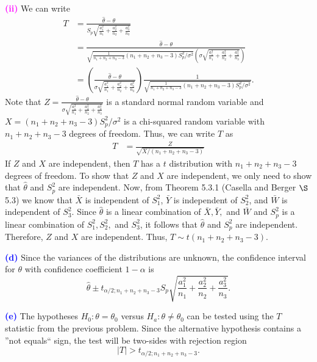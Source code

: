 \documentclass[12pt]{article}
\begin{document}
\noindent\textcolor{magenta}{\textbf{(ii)}} We can write
\begin{align}
T &= \frac{\hat{\theta}-\theta}{S_p\sqrt{\frac{a_1^2}{n_1}+\frac{a_2^2}{n_2}+\frac{a_3^2}{n_3}}} \\
&= \frac{\hat{\theta}-\theta}{\sqrt{\frac{1}{n_1+n_2+n_3-3}(n_1+n_2+n_3 - 3)S_p^2/\sigma^2}\left(\sigma\sqrt{\frac{a_1^2}{n_1}+\frac{a_2^2}{n_2}+\frac{a_3^2}{n_3}}\right)} \\ 
&= \left(\frac{\hat{\theta}-\theta}{\sigma\sqrt{\frac{a_1^2}{n_1}+\frac{a_2^2}{n_2}+\frac{a_3^2}{n_3}}}\right)\frac{1}{\sqrt{\frac{1}{n_1+n_2+n_3-3}(n_1+n_2+n_3 - 3)S_p^2/\sigma^2}}.
\end{align}
Note that $Z=\frac{\hat{\theta}-\theta}{\sigma\sqrt{\frac{a_1^2}{n_1}+\frac{a_2^2}{n_2}+\frac{a_3^2}{n_3}}}$ is a standard normal random variable and $X = (n_1+n_2+n_3 - 3)S_p^2/\sigma^2$ is a chi-squared random variable with $n_1+n_2+n_3-3$ degrees of freedom. Thus, we can write $T$ as
\begin{align}
T &= \frac{Z}{\sqrt{X/(n_1+n_2+n_3-3)}}
\end{align}
If $Z$ and $X$ are independent, then $T$ has a $t$ distribution with $n_1+n_2+n_3-3$ degrees of freedom. To show that $Z$ and $X$ are independent, we only need to show that $\hat{\theta}$ and $S_p^2$ are independent. Now, from Theorem 5.3.1 (Casella and Berger $\S$ 5.3) we know that $\bar{X}$ is independent of $S_1^2$, $\bar{Y}$ is independent of $S_2^2$, and $\bar{W}$ is independent of $S_3^2$. Since $\hat{\theta}$ is a linear combination of $\bar{X}, \bar{Y},$ and $\bar{W}$ and $S_p^2$ is a linear combination of $S_1^2, S_2^2,$ and $S_3^2$, it follows that $\hat{\theta}$ and $S_p^2$ are independent. Therefore, $Z$ and $X$ are independent. Thus, $T\sim t(n_1+n_2+n_3-3)$. 

\vspace{3mm}

\noindent \textcolor{blue}{\textbf{(d)}} Since the variances of the distributions are unknown, the confidence interval for $\theta$ with confidence coefficient $1-\alpha$ is $$\hat{\theta} \pm t_{\alpha/2; n_1+n_2+n_3 - 3}S_p\sqrt{\frac{a_1^2}{n_1} + \frac{a_2^2}{n_2}+\frac{a_3^2}{n_3}}.$$ 

\vspace{3mm}

\noindent \textcolor{blue}{\textbf{(e)}} The hypotheses $H_0: \theta = \theta_0$ versus $H_a: \theta \neq \theta_0$ can be tested using the $T$ statistic from the previous problem. Since the alternative hypothesis contains a ''not equals`` sign, the test will be two-sides with rejection region $$|T| >t_{\alpha/2;n_1+n_2+n_3-3}.$$
\end{document}
